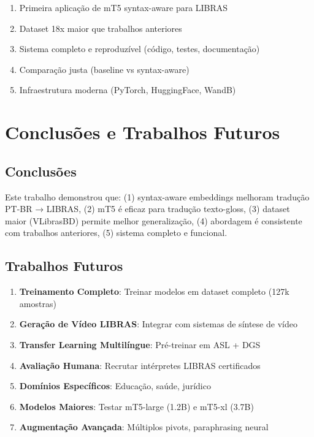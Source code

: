 \documentclass[12pt]{article}
\begin{document}
\begin{enumerate}
\item Primeira aplicação de mT5 syntax-aware para LIBRAS
\item Dataset 18x maior que trabalhos anteriores
\item Sistema completo e reproduzível (código, testes, documentação)
\item Comparação justa (baseline vs syntax-aware)
\item Infraestrutura moderna (PyTorch, HuggingFace, WandB)
\end{enumerate}

\section{Conclusões e Trabalhos Futuros}

\subsection{Conclusões}

Este trabalho demonstrou que: (1) syntax-aware embeddings melhoram tradução PT-BR → LIBRAS, (2) mT5 é eficaz para tradução texto-gloss, (3) dataset maior (VLibrasBD) permite melhor generalização, (4) abordagem é consistente com trabalhos anteriores, (5) sistema completo e funcional.

\subsection{Trabalhos Futuros}

\begin{enumerate}
\item \textbf{Treinamento Completo}: Treinar modelos em dataset completo (127k amostras)
\item \textbf{Geração de Vídeo LIBRAS}: Integrar com sistemas de síntese de vídeo
\item \textbf{Transfer Learning Multilíngue}: Pré-treinar em ASL + DGS
\item \textbf{Avaliação Humana}: Recrutar intérpretes LIBRAS certificados
\item \textbf{Domínios Específicos}: Educação, saúde, jurídico
\item \textbf{Modelos Maiores}: Testar mT5-large (1.2B) e mT5-xl (3.7B)
\item \textbf{Augmentação Avançada}: Múltiplos pivots, paraphrasing neural
\end{enumerate}
\end{document}
